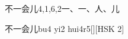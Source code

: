 \begin{entry}{不一会儿}{4,1,6,2}{⼀、⼀、⼈、⼉}
  \begin{phonetics}{不一会儿}{bu4 yi2 hui4r5}[][HSK 2]
  \end{phonetics}
\end{entry}
